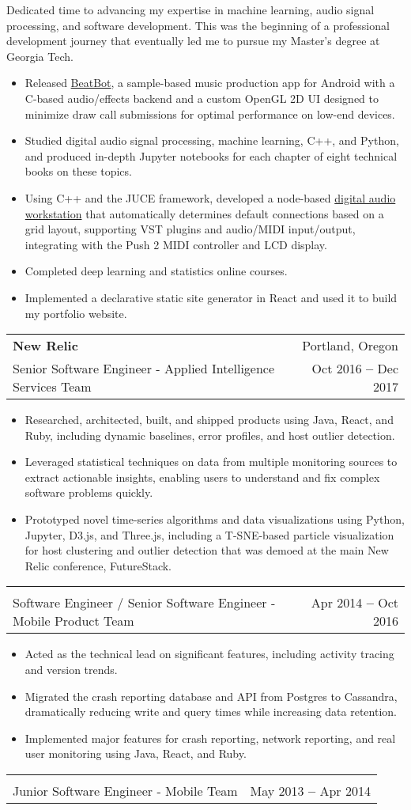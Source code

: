 \documentclass[letterpaper,11pt]{article}
\makeatletter
\newcommand{\resumeItem}[1]{
  \item\small{
    {#1 \vspace{-2pt}}
  }
}
\newcommand{\resumeSubheading}[4]{
  \item
    \begin{tabular*}{0.97\textwidth}[t]{l@{\extracolsep{\fill}}r}
      \normalsize \textbf{#1} & \small#2 \\
      \small #3 & \small #4 \\
    \end{tabular*}\vspace{-9pt}
}
\newcommand{\resumeItemListStart}{\begin{itemize}}
\newcommand{\resumeItemListEnd}{\end{itemize}\vspace{-5pt}}
\newcommand{\resumeSectionBody}[1]{
  \vspace{0.7em}
  \small #1
  \vspace{-5pt}
}
\makeatother
\begin{document}
      \resumeSectionBody{
        Dedicated time to advancing my expertise in machine learning, audio signal processing, and software development.
        This was the beginning of a professional development journey that eventually led me to pursue my Master's degree at Georgia Tech.
      }
      \resumeItemListStart
        \resumeItem{Released \href{https://karlhiner.com/beatbot}{BeatBot}, a sample-based music production app for Android with a C-based audio/effects backend and a custom OpenGL 2D UI designed to minimize draw call submissions for optimal performance on low-end devices.}
        \resumeItem{Studied digital audio signal processing, machine learning, C++, and Python, and produced in-depth Jupyter notebooks for each chapter of eight technical books on these topics.}
        \resumeItem{Using C++ and the JUCE framework, developed a node-based \href{https://github.com/khiner/flowgrid_old}{digital audio workstation} that automatically determines default connections based on a grid layout, supporting VST plugins and audio/MIDI input/output, integrating with the Push 2 MIDI controller and LCD display.}
        \resumeItem{Completed deep learning and statistics online courses.}
        \resumeItem{Implemented a declarative static site generator in React and used it to build my portfolio website.}
      \resumeItemListEnd
    \newpage
    \resumeSubheading
      {New Relic}{Portland, Oregon}
      {Senior Software Engineer - Applied Intelligence Services Team}{Oct 2016 \textbf{--} Dec 2017}

        \resumeItemListStart
          \resumeItem{Researched, architected, built, and shipped products using Java, React, and Ruby, including dynamic baselines, error profiles, and host outlier detection.}
          \resumeItem{Leveraged statistical techniques on data from multiple monitoring sources to extract actionable insights, enabling users to understand and fix complex software problems quickly.}
          \resumeItem{Prototyped novel time-series algorithms and data visualizations using Python, Jupyter, D3.js, and Three.js, including a T-SNE-based particle visualization for host clustering and outlier detection that was demoed at the main New Relic conference, FutureStack.}
        \resumeItemListEnd
        \vspace{-15pt}
    \resumeSubheading
      {}{}
      {Software Engineer / Senior Software Engineer - Mobile Product Team}{Apr 2014 \textbf{--} Oct 2016}
        \resumeItemListStart
        \resumeItem{Acted as the technical lead on significant features, including activity tracing and version trends.}
        \resumeItem{Migrated the crash reporting database and API from Postgres to Cassandra, dramatically reducing write and query times while increasing data retention.}
        \resumeItem{Implemented major features for crash reporting, network reporting, and real user monitoring using Java, React, and Ruby.}
        \resumeItemListEnd
        \vspace{-15pt}
    \resumeSubheading
      {}{}
      {Junior Software Engineer - Mobile Team}{May 2013 \textbf{--} Apr 2014}
\end{document}
